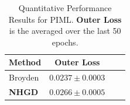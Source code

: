 \documentclass[11 pt]{article}
\begin{document}
\begin{table}[h]
\centering
\caption{Quantitative Performance Results for PIML.  \textbf{Outer Loss} is the averaged over the last 50 epochs.}
\label{tb:piml_quant}
\begin{tabular}{lccc}
\toprule
\textbf{Method}  & \textbf{Outer Loss} \\
\midrule
Broyden       
& $0.0237 \pm 0.0003$  \\ 

\textbf{NHGD}        
& $0.0266 \pm 0.0005$ \\
\bottomrule
\end{tabular}
\end{table}





	
\end{document}
